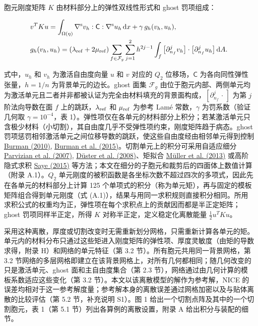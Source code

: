 \documentclass[preprint,12pt,authoryear]{elsarticle}
\begin{document}
胞元刚度矩阵 \(K\) 由材料部分上的弹性双线性形式和 ghost 罚项组成：

\[
\begin{aligned}
&v^TKu=\int_{\Omega(\eta)}\nabla^{\rm s}v_h:\mathsf C:\nabla^{\rm s}u_h\,\mathrm dx+\gamma\,g_h(v_h,u_h),\\
&g_h(v_h,u_h)=(\lambda_{\rm ref}+2\mu_{\rm ref})\sum_{f\in\mathcal F_g}\sum_{j=1}^{2}h^{2j-1}\int_f\big[\partial_{n_f}^{j}v_h\big]\cdot\big[\partial_{n_f}^{j}u_h\big]\,\mathrm dA.
\end{aligned}
\]

式中，\(u_h\) 和 \(v_h\) 为激活自由度向量 \(u\) 和 \(v\) 对应的 \(Q_2\) 位移场，\(\mathsf C\) 为各向同性弹性张量，\(h=1/n\) 为背景单元的边长。ghost 面集 \(\mathcal F_g\) 由位于胞元内部、两侧单元均为激活单元且二者并非都被认证为完全由材料填充的背景面构成，\([\partial_{n_f}^{j}\,\cdot\,]\) 为第 \(j\) 阶法向导数在面 \(f\) 上的跳跃，\(\lambda_{\rm ref}\) 和 \(\mu_{\rm ref}\) 为参考 Lamé 常数，\(\gamma\) 为罚系数（验证几何取 \(\gamma=10^{-4}\)，表 1）。弹性项仅在各单元的材料部分上积分；若某激活单元只含极少材料（小切割），其自由度几乎不受弹性项约束，刚度矩阵趋于病态。ghost 罚项惩罚相邻激活单元之间位移导数的跳跃，使这些自由度经由相邻单元得到控制 \href{https://doi.org/10.1016/j.crma.2010.10.006}{Burman (2010)}, \href{https://doi.org/10.1002/nme.4823}{Burman et al. (2015)}。切割单元上的积分可采用自适应细分 \href{https://doi.org/10.1007/s00466-007-0173-y}{Parvizian et al. (2007)}, \href{https://doi.org/10.1016/j.cma.2008.02.036}{Düster et al. (2008)}、矩拟合 \href{https://doi.org/10.1002/nme.4569}{Müller et al. (2013)} 或高阶隐式求积 \href{https://doi.org/10.1137/140966290}{Saye (2015)} 等方法；本文在细分的子胞元和裁剪后的四面体上数值计算（附录 A.1）。\(Q_2\) 单元刚度的被积函数是各坐标次数不超过四次的多项式，因此先在各单元的材料部分上计算 125 个单项式的积分（称为单元矩），再与固定的模板矩阵组合得到单元刚度（式 (A.1)），结果与用同一求积规则直接积分相同。所用求积公式的权重均为正，弹性项在每个求积点上的贡献因而都是半正定矩阵；ghost 罚项同样半正定，所得 \(K\) 对称半正定，定义稳定化离散能量 \(\tfrac12u^TKu\)。

采用这种离散，厚度或切割改变时无需重新划分网格，只需重新计算各单元的矩。单元内的材料分布只通过这些矩进入刚度矩阵的弹性项、厚度灵敏度（由矩的导数求得，附录 H）和网络的单元特征（第 3.2 节）。所有胞元共用同一背景网格，第 3.2 节网络的多层网格即建立在该背景网格上，对所有几何都相同；随几何改变的只是激活单元、ghost 面和主自由度集合（第 2.3 节），网络通过由几何计算的模板系数适应这些变化（第 3.2 节）。本文以该离散模型的解作为参考解，NICE 的误差均相对于这一参考解度量；参考解本身的离散误差通过网格加密以及与贴体离散的比较评估（第 5.2 节，补充说明 S1）。图 1 给出一个切割点阵及其中的一个切割胞元，表 1（第 5.1 节）列出各算例的离散设置，附录 A 给出积分与装配的细节。
\end{document}
